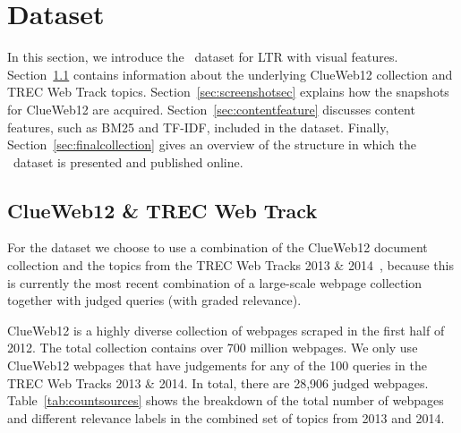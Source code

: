 
\section{\protect\datasetname{} Data\-set}
In this section, we introduce the \datasetname~data\-set for \ac{LTR} with visual features. 
Section~\ref{sec:trecclue} contains information about the underlying ClueWeb12 collection and TREC Web Track topics.
Section~\ref{sec:screenshotsec} explains how the snapshots for ClueWeb12 are acquired.
Section~\ref{sec:contentfeature} discusses content features, such as BM25 and TF-IDF, included in the \datasetname{} dataset.
Finally, Section~\ref{sec:finalcollection} gives an overview of the structure in which the \datasetname~dataset is presented and published online.

\subsection{ClueWeb12 \& TREC Web Track}\label{sec:trecclue}
For the \datasetname{} dataset we choose to use a combination of the ClueWeb12 document collection and the topics from the TREC Web Tracks 2013 \& 2014~\cite{collins2013trec,collins2015trec},
because this is currently the most recent combination of a large-scale webpage collection together with judged queries (with graded relevance). 

ClueWeb12 is a highly diverse collection of webpages scraped in the first half of 2012.
The total collection contains over 700 million webpages.
%
We only use ClueWeb12 webpages that have judgements for any of the 100 queries in the TREC Web Tracks 2013 \& 2014.
In total, there are 28,906 judged webpages.
%
Table~\ref{tab:countsources} shows the breakdown of the total number of webpages and different relevance labels in the combined set of topics from 2013 and 2014.

